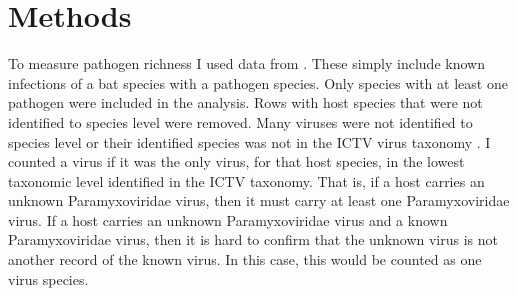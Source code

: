 
\section{Methods}






















































To measure pathogen richness I used data from \cite{luis2013comparison}. 
These simply include known infections of a bat species with a pathogen species. 
Only species with at least one pathogen were included in the analysis.
Rows with host species that were not identified to species level were removed.
Many viruses were not identified to species level or their identified species was not in the ICTV virus taxonomy \cite{ICTV}.
I counted a virus if it was the only virus, for that host species, in the lowest taxonomic level identified in the ICTV taxonomy.
That is, if a host carries an unknown Paramyxoviridae virus, then it must carry at least one Paramyxoviridae virus.
If a host carries an unknown Paramyxoviridae virus and a known Paramyxoviridae virus, then it is hard to confirm that the unknown virus is not another record of the known virus.
In this case, this would be counted as one virus species.






